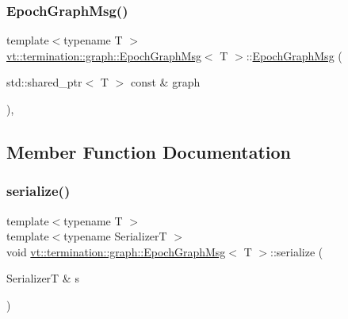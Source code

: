 \mbox{\label{structvt_1_1termination_1_1graph_1_1_epoch_graph_msg_a3d594c68531bdbc1b114f4b52557d648}} 
\subsubsection{\texorpdfstring{Epoch\+Graph\+Msg()}{EpochGraphMsg()}\hspace{0.1cm}{\footnotesize\ttfamily [2/2]}}
{\footnotesize\ttfamily template$<$typename T $>$ \\
\hyperlink{structvt_1_1termination_1_1graph_1_1_epoch_graph_msg}{vt\+::termination\+::graph\+::\+Epoch\+Graph\+Msg}$<$ T $>$\+::\hyperlink{structvt_1_1termination_1_1graph_1_1_epoch_graph_msg}{Epoch\+Graph\+Msg} (\begin{DoxyParamCaption}\item[{std\+::shared\+\_\+ptr$<$ T $>$ const \&}]{graph }\end{DoxyParamCaption})\hspace{0.3cm}{\ttfamily [inline]}, {\ttfamily [explicit]}}



\subsection{Member Function Documentation}
\mbox{\label{structvt_1_1termination_1_1graph_1_1_epoch_graph_msg_af799d374db4de6b194128e4032e3d412}} 
\subsubsection{\texorpdfstring{serialize()}{serialize()}}
{\footnotesize\ttfamily template$<$typename T $>$ \\
template$<$typename SerializerT $>$ \\
void \hyperlink{structvt_1_1termination_1_1graph_1_1_epoch_graph_msg}{vt\+::termination\+::graph\+::\+Epoch\+Graph\+Msg}$<$ T $>$\+::serialize (\begin{DoxyParamCaption}\item[{SerializerT \&}]{s }\end{DoxyParamCaption})\hspace{0.3cm}{\ttfamily [inline]}}

